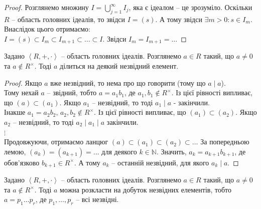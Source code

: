 \documentclass{math_library}
\begin{document}
\begin{proof}
Розглянемо множину $I = \displaystyle\bigcup_{j=1}^\infty I_j$, яка є ідеалом -- це зрозуміло. Оскільки $R$ -- область головних ідеалів, то звідси $I = (s)$. А тому звідси $\exists m > 0: s \in I_m$. Внаслідок цього отримаємо:\\
$I = (s) \subset I_m \subset I_{m+1} \subset \dots \subset I$. Звідси $I_m = I_{m+1} = \dots$
\end{proof}

\begin{lemma}
Задано $\left<R,+,\cdot \right>$ -- область головних ідеалів. Розглянемо $a \in R$ такий, що $a \neq 0$ та $a \notin R^\times$. Тоді $a$ ділиться на деякий незвідний елемент.
\end{lemma}

\begin{proof}
Якщо $a$ вже незвідний, то нема про що говорити (тому що $a \mid a$).\\
Тому нехай $a$ -- звідний, тобто $a = a_1b_1$, де $a_1,b_1 \not \in R^\times$. Із цієї рівності випливає, що $(a) \subset (a_1)$. Якщо $a_1$ -- незвідний, то тоді $a_1 \mid a$ - закінчили.\\
Інакше $a_1 = a_2b_2$, $a_2,b_2 \not\in R^\times$. Із цієї рівності випливає, що $(a_1) \subset (a_2)$. Якщо $a_2$ -- незвідний, то тоді $a_2 \mid a_1 \mid a$ закінчили.\\
$\vdots$\\
Продовжуючи, отримаємо ланцюг $(a) \subset (a_1) \subset (a_2) \subset \dots$ За попередньою лемою, $(a_k) = (a_{k+1}) = \dots$ для деякого $k \in \mathbb{N}$. Значить, $a_k = a_{k+1} b_{k+1}$, де обов'язково $b_{k+1} \in R^\times$. А тому $a_k$ -- останній незвідний, для якого $a_k \mid a$.
\end{proof}

\begin{lemma}
Задано $\left<R,+,\cdot \right>$ -- область головних ідеалів. Розглянемо $a \in R$ такий, що $a \neq 0$ та $a \notin R^\times$. Тоді $a$ можна розкласти на добуток незвідних елементів, тобто\\
$a = p_1 \dots p_r$, де $p_1,\dots,p_r$ -- всі незвідні.
\end{lemma}
\end{document}
